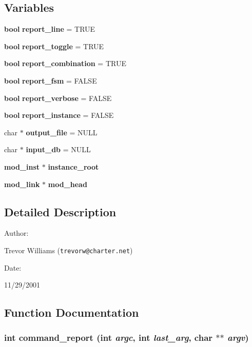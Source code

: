 \subsection*{Variables}
\begin{CompactItemize}
\item 
{\bf bool} {\bf report\_\-line} = TRUE
\item 
{\bf bool} {\bf report\_\-toggle} = TRUE
\item 
{\bf bool} {\bf report\_\-combination} = TRUE
\item 
{\bf bool} {\bf report\_\-fsm} = FALSE
\item 
{\bf bool} {\bf report\_\-verbose} = FALSE
\item 
{\bf bool} {\bf report\_\-instance} = FALSE
\item 
char $\ast$ {\bf output\_\-file} = NULL
\item 
char $\ast$ {\bf input\_\-db} = NULL
\item 
{\bf mod\_\-inst} $\ast$ {\bf instance\_\-root}
\item 
{\bf mod\_\-link} $\ast$ {\bf mod\_\-head}
\end{CompactItemize}


\subsection{Detailed Description}


\begin{Desc}
\item[Author: ]\par
Trevor Williams ({\tt trevorw@charter.net}) \end{Desc}
\begin{Desc}
\item[Date: ]\par
11/29/2001\end{Desc}


\subsection{Function Documentation}
\subsubsection{\setlength{\rightskip}{0pt plus 5cm}int command\_\-report (int {\em argc}, int {\em last\_\-arg}, char $\ast$$\ast$ {\em argv})}\label{report_8c_a17}


